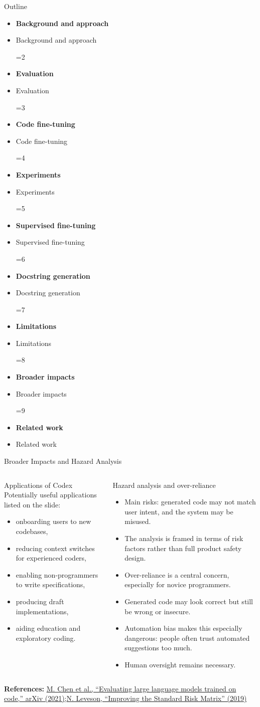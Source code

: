 \documentclass[aspectratio=43,9pt]{beamer}
\newcommand{\srclink}[2]{\href{#2}{\textcolor{black!68}{#1}}}
\newcommand{\sep}{;\hspace{0.35em}}
\newcommand{\refline}[2][References]{%
  \vfill
  {\raggedright\fontsize{5.1}{5.5}\selectfont\color{black!68}\textbf{#1:} #2\par}%
}
\newcommand{\srcChen}{\srclink{M. Chen et al., ``Evaluating large language models trained on code,'' arXiv (2021)}{https://arxiv.org/abs/2107.03374}}
\newcommand{\srcLeveson}{\srclink{N. Leveson, ``Improving the Standard Risk Matrix'' (2019)}{https://sunnyday.mit.edu/Risk-Matrix.pdf}}
\newcommand{\outlineitem}[2]{%
  \ifnum\currentstage=#1\relax
    \item[{\textcolor{black}{\large\textbullet}}] {\color{black}\bfseries #2}
  \else
    \item[{\textcolor{black}{\large\textbullet}}] {\color{black!70}#2}
  \fi
}
\newcommand{\outlineframe}[1]{%
\begin{frame}{Outline}
\small
\def\currentstage{#1}
\begin{itemize}
  \setlength{\itemsep}{0.45em}
  \outlineitem{1}{Background and approach}
  \outlineitem{2}{Evaluation}
  \outlineitem{3}{Code fine-tuning}
  \outlineitem{4}{Experiments}
  \outlineitem{5}{Supervised fine-tuning}
  \outlineitem{6}{Docstring generation}
  \outlineitem{7}{Limitations}
  \outlineitem{8}{Broader impacts}
  \outlineitem{9}{Related work}
\end{itemize}
\end{frame}
}
\begin{document}
\outlineframe{8}

\begin{frame}{Broader Impacts and Hazard Analysis}
\scriptsize
\begin{columns}[T,totalwidth=\textwidth]
\begin{block}{Applications of Codex}
Potentially useful applications listed on the slide:
\begin{itemize}
  \item onboarding users to new codebases,
  \item reducing context switches for experienced coders,
  \item enabling non-programmers to write specifications,
  \item producing draft implementations,
  \item aiding education and exploratory coding.
\end{itemize}
\end{block}

\begin{block}{Hazard analysis and over-reliance}
\begin{itemize}
  \item Main risks: generated code may not match user intent, and the system may be misused.
  \item The analysis is framed in terms of risk factors rather than full product safety design.
  \item Over-reliance is a central concern, especially for novice programmers.
  \item Generated code may look correct but still be wrong or insecure.
  \item Automation bias makes this especially dangerous: people often trust automated suggestions too much.
  \item Human oversight remains necessary.
\end{itemize}
\end{block}
\end{columns}

\refline{\srcChen\sep \srcLeveson}
\end{frame}
\end{document}
